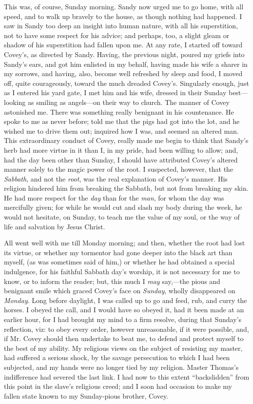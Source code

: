 This was, of course, Sunday morning. Sandy now urged me to go home, with
all speed, and to walk up bravely to the house, as though nothing had
happened. I saw in Sandy too deep an insight into
{\protect\hypertarget{240}{}{}}human nature, with all his superstition,
not to have some respect for his advice; and perhaps, too, a slight
gleam or shadow of his superstition had fallen upon me. At any rate, I
started off toward Covey's, as directed by Sandy. Having, the previous
night, poured my griefs into Sandy's ears, and got him enlisted in my
behalf, having made his wife a sharer in my sorrows, and having, also,
become well refreshed by sleep and food, I moved off, quite
courageously, toward the much dreaded Covey's. Singularly enough, just
as I entered his yard gate, I met him and his wife, dressed in their
Sunday best---looking as smiling as angels---on their way to church. The
manner of Covey astonished me. There was something really benignant in
his countenance. He spoke to me as never before; told me that the pigs
had got into the lot, and he wished me to drive them out; inquired how I
was, and seemed an altered man. This extraordinary conduct of Covey,
really made me begin to think that Sandy's herb had more virtue in it
than I, in my pride, had been willing to allow; and, had the day been
other than Sunday, I should have attributed Covey's altered manner
solely to the magic power of the root. I suspected, however, that the
\emph{Sabbath}, and not the \emph{root}, was the real explanation of
Covey's manner. His religion hindered him from breaking the Sabbath, but
not from breaking my skin. He had more respect for the \emph{day} than
for the \emph{man}, for whom the day was mercifully given; for while he
would cut and slash my body during the week, he would not hesitate, on
Sunday, to teach me the value {\protect\hypertarget{241}{}{}}of my soul,
or the way of life and salvation by Jesus Christ.

All went well with me till Monday morning; and then, whether the root
had lost its virtue, or whether my tormentor had gone deeper into the
black art than myself, (as was sometimes said of him,) or whether he had
obtained a special indulgence, for his faithful Sabbath day's worship,
it is not necessary for me to know, or to inform the reader; but, this
much I \emph{may} say,---the pious and benignant smile which graced
Covey's face on \emph{Sunday}, wholly disappeared on \emph{Monday}. Long
before daylight, I was called up to go and feed, rub, and curry the
horses. I obeyed the call, and I would have so obeyed it, had it been
made at an earlier hour, for I had brought my mind to a firm resolve,
during that Sunday's reflection, viz: to obey every order, however
unreasonable, if it were possible, and, if Mr. Covey should then
undertake to beat me, to defend and protect myself to the best of my
ability. My religious views on the subject of resisting my master, had
suffered a serious shock, by the savage persecution to which I had been
subjected, and my hands were no longer tied by my religion. Master
Thomas's indifference had severed the last link. I had now to this
extent ``backslidden'' from this point in the slave's religious creed;
and I soon had occasion to make my fallen state known to my Sunday-pious
brother, Covey.

